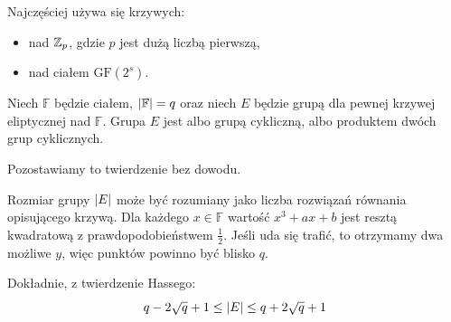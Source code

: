 Najczęściej używa się krzywych:
\begin{itemize}
    \item nad \( \mathbb{Z}_p \), gdzie \( p \) jest dużą liczbą pierwszą,
    \item nad ciałem \( \text{GF}(2^s) \).
\end{itemize}

\begin{theorem}
    Niech \( \mathbb{F} \) będzie ciałem, \( \left\lvert\mathbb{F}\right\rvert = q \) oraz niech \( E \) będzie grupą dla pewnej krzywej eliptycznej nad \( \mathbb{F} \). Grupa \( E \) jest albo grupą cykliczną, albo produktem dwóch grup cyklicznych.
\end{theorem}
Pozostawiamy to twierdzenie bez dowodu.

Rozmiar grupy \( \left\lvert E\right\rvert \) może być rozumiany jako liczba rozwiązań równania opisującego krzywą.
Dla każdego \( x \in \mathbb{F} \) wartość \( x^3 + ax + b \) jest resztą kwadratową z prawdopodobieństwem \( \frac{1}{2} \). Jeśli uda się trafić, to otrzymamy dwa możliwe \( y \), więc punktów powinno być blisko \( q \).

Dokładnie, z twierdzenie Hassego: 
\[
    q - 2\sqrt{q} + 1 \leq \left\lvert E\right\rvert \leq q + 2\sqrt{q} + 1
\]